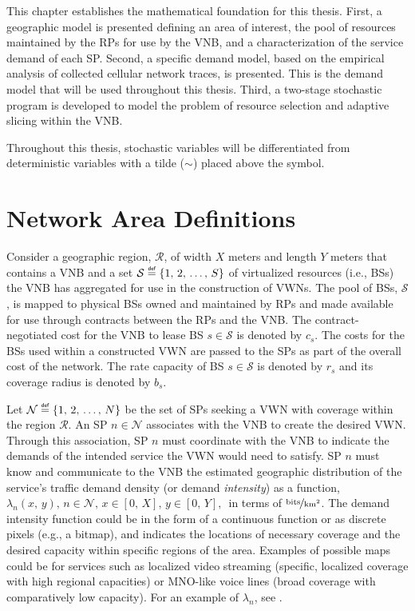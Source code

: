 \documentclass[12pt,dvipsnames]{report}
\newcommand\defeq{\mathrel{\overset{\makebox[0pt]{\mbox{\normalfont\tiny\sffamily def}}}{=}}}
\begin{document}
This chapter establishes the mathematical foundation for this thesis.  First, a geographic model is presented defining an area of interest, the pool of resources maintained by the RPs for use by the VNB, and a characterization of the service demand of each SP.  Second, a specific demand model, based on the empirical analysis of collected cellular network traces, is presented.  This is the demand model that will be used throughout this thesis.  Third, a two-stage stochastic program is developed to model the problem of resource selection and adaptive slicing within the VNB.

Throughout this thesis, stochastic variables will be differentiated from deterministic variables with a tilde ($\sim$) placed above the symbol.

\section{Network Area Definitions} \label{sec:networkdefs}

Consider a geographic region, $\mathcal{R}$, of width $X$ meters and length $Y$ meters that contains a VNB and a set $\mathcal{S} \defeq \left\{ 1,\, 2,\, \ldots,\, S \right\}$ of virtualized resources (i.e., BSs) the VNB has aggregated for use in the construction of VWNs.  The pool of BSs, $\mathcal{S}$, is mapped to physical BSs owned and maintained by RPs and made available for use through contracts between the RPs and the VNB.  The contract-negotiated cost for the VNB to lease BS $s \in \mathcal{S}$ is denoted by $c_s$.  The costs for the BSs used within a constructed VWN are passed to the SPs as part of the overall cost of the network.  The rate capacity of BS $s \in \mathcal{S}$ is denoted by $r_s$ and its coverage radius is denoted by $b_s$.

Let $\mathcal{N} \defeq \left\{ 1,\, 2,\, \ldots,\, N \right\}$ be the set of SPs seeking a VWN with coverage within the region $\mathcal{R}$.  An SP $n \in \mathcal{N}$ associates with the VNB to create the desired VWN.  Through this association, SP $n$ must coordinate with the VNB to indicate the demands of the intended service the VWN would need to satisfy.  SP $n$ must know and communicate to the VNB the estimated geographic distribution of the service's traffic demand density (or demand \emph{intensity}) as a function, $\lambda_n\left( x,\, y \right),\, n \in \mathcal{N},\, x \in \left[ 0,\, X \right],\, y \in \left[ 0,\, Y \right],\,$ in terms of $\nicefrac{\text{bits}}{\text{km}^2}$.  The demand intensity function could be in the form of a continuous function or as discrete pixels (e.g., a bitmap), and indicates the locations of necessary coverage and the desired capacity within specific regions of the area.  Examples of possible maps could be for services such as localized video streaming (specific, localized coverage with high regional capacities) or MNO-like voice lines (broad coverage with comparatively low capacity).  For an example of $\lambda_n$, see .
\end{document}
